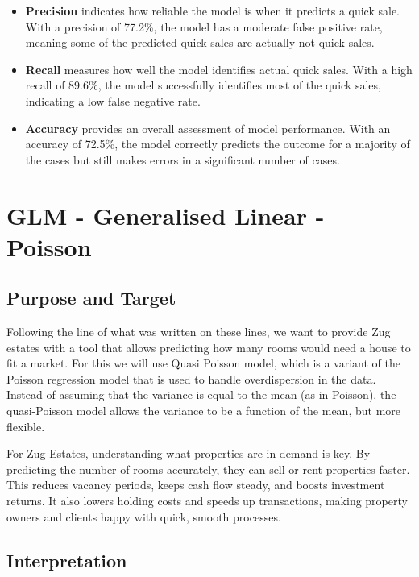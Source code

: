 \documentclass[
]{article}
\begin{document}
\begin{itemize}
\item
  \textbf{Precision} indicates how reliable the model is when it
  predicts a quick sale. With a precision of 77.2\%, the model has a
  moderate false positive rate, meaning some of the predicted quick
  sales are actually not quick sales.
\item
  \textbf{Recall} measures how well the model identifies actual quick
  sales. With a high recall of 89.6\%, the model successfully identifies
  most of the quick sales, indicating a low false negative rate.
\item
  \textbf{Accuracy} provides an overall assessment of model performance.
  With an accuracy of 72.5\%, the model correctly predicts the outcome
  for a majority of the cases but still makes errors in a significant
  number of cases.
\end{itemize}

\section{GLM - Generalised Linear -
Poisson}\label{glm---generalised-linear---poisson}

\subsection{Purpose and Target}\label{purpose-and-target-2}

Following the line of what was written on these lines, we want to
provide Zug estates with a tool that allows predicting how many rooms
would need a house to fit a market. For this we will use Quasi Poisson
model, which is a variant of the Poisson regression model that is used
to handle overdispersion in the data. Instead of assuming that the
variance is equal to the mean (as in Poisson), the quasi-Poisson model
allows the variance to be a function of the mean, but more flexible.

For Zug Estates, understanding what properties are in demand is key. By
predicting the number of rooms accurately, they can sell or rent
properties faster. This reduces vacancy periods, keeps cash flow steady,
and boosts investment returns. It also lowers holding costs and speeds
up transactions, making property owners and clients happy with quick,
smooth processes.

\subsection{Interpretation}\label{interpretation-2}
\end{document}
